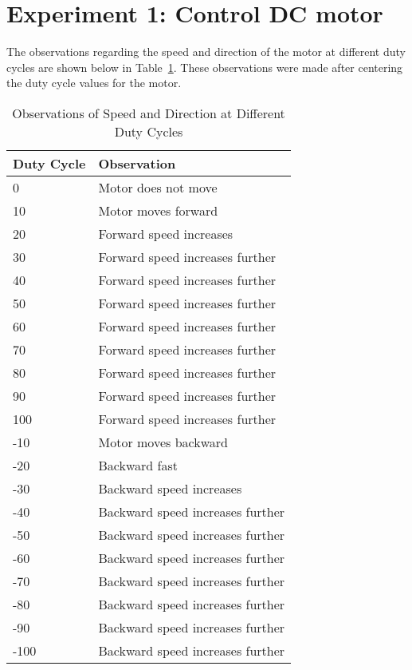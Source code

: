 \section*{Experiment 1: Control DC motor}
The observations regarding the speed and direction of the motor at different duty cycles are shown below in Table~\ref{tab:exp1}. These observations were made after centering the duty cycle values for the motor. 
\begin{table}[htp]
\centering
\caption[exp1]{Observations of Speed and Direction at Different Duty Cycles}
\label{tab:exp1}
\begin{tabular}{|l|l|}
\hline
Duty Cycle & Observation                                 \\ \hline
0          & Motor does not move                         \\ \hline
10         & Motor moves forward                         \\ \hline
20         & Forward speed increases                     \\ \hline
30         & Forward speed increases further             \\ \hline
40         & Forward speed increases further             \\ \hline
50         & Forward speed increases further             \\ \hline
60         & Forward speed increases further             \\ \hline
70         & Forward speed increases further             \\ \hline
80         & Forward speed increases further             \\ \hline
90         & Forward speed increases further             \\ \hline
100        & Forward speed increases further             \\ \hline
-10        & Motor moves backward                        \\ \hline
-20        & Backward fast                               \\ \hline
-30        & Backward speed increases                    \\ \hline
-40        & Backward speed increases further            \\ \hline
-50        & Backward speed increases further            \\ \hline
-60        & Backward speed increases further            \\ \hline
-70        & Backward speed increases further            \\ \hline
-80        & Backward speed increases further            \\ \hline
-90        & Backward speed increases further            \\ \hline
-100       & Backward speed increases further            \\ \hline
\end{tabular}
\end{table}